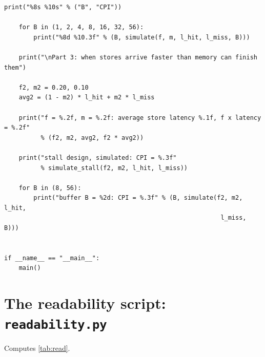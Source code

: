\begin{lstlisting}[style=vspython]
    print("%8s %10s" % ("B", "CPI"))

    for B in (1, 2, 4, 8, 16, 32, 56):
        print("%8d %10.3f" % (B, simulate(f, m, l_hit, l_miss, B)))

    print("\nPart 3: when stores arrive faster than memory can finish them")

    f2, m2 = 0.20, 0.10
    avg2 = (1 - m2) * l_hit + m2 * l_miss

    print("f = %.2f, m = %.2f: average store latency %.1f, f x latency = %.2f"
          % (f2, m2, avg2, f2 * avg2))
    
    print("stall design, simulated: CPI = %.3f"
          % simulate_stall(f2, m2, l_hit, l_miss))
    
    for B in (8, 56):
        print("buffer B = %2d: CPI = %.3f" % (B, simulate(f2, m2, l_hit,
                                                           l_miss, B)))


if __name__ == "__main__":
    main()
\end{lstlisting}

\section{The readability script: \texttt{readability.py}}
Computes \cref{tab:read}.

